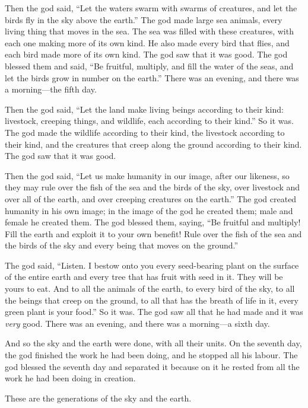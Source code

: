 Then the god said, 
\enquote{Let the waters swarm with swarms of creatures, 
and let the birds fly in the sky above the earth.} 
The god made large sea animals, every living thing that moves in the sea. 
The sea was filled with these creatures, 
with each one making more of its own kind. 
He also made every bird that flies, 
and each bird made more of its own kind. 
The god saw that it was good. 
The god blessed them and said, 
\enquote{Be fruitful, multiply, and fill the water of the seas, 
and let the birds grow in number on the earth.} 
There was an evening, and there was a morning---the fifth day.

Then the god said, 
\enquote{Let the land make living beings according to their kind: 
livestock, creeping things, and wildlife, each according to their kind.}
So it was. 
The god made the wildlife according to their kind, 
the livestock according to their kind, 
and the creatures that creep along the ground according to their kind. 
The god saw that it was good. 

Then the god said, 
\enquote{Let us make humanity in our image, after our likeness, 
so they may rule over the fish of the sea and the birds of the sky, 
over livestock and over all of the earth, 
and over creeping creatures on the earth.} 
The god created humanity in his own image; 
in the image of the god he created them;
male and female he created them. 
The god blessed them, saying, 
\enquote{Be fruitful and multiply! 
Fill the earth and exploit it to your own benefit! 
Rule over the fish of the sea and the birds of the sky 
and every being that moves on the ground.} 

The god said, 
\enquote{Listen. 
I bestow onto you every seed-bearing plant on the surface of the entire earth 
and every tree that has fruit with seed in it. 
They will be yours to eat. 
And to all the animals of the earth, 
to every bird of the sky, 
to all the beings that creep on the ground, 
to all that has the breath of life in it, 
every green plant is your food.} 
So it was. 
The god saw all that he had made and it was \textit{very} good. 
There was an evening, and there was a morning---a sixth day.

And so the sky and the earth were done, with all their units. 
On the seventh day, the god finished the work he had been doing, 
and he stopped all his labour. 
The god blessed the seventh day and separated it 
because on it he rested from all the work he had been doing in creation.

These are the generations of the sky and the earth. 
